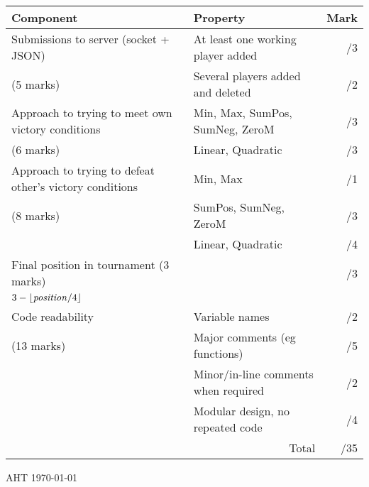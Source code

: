 \documentclass{article}
\begin{document}
\begin{tabular}{|l|l|r|}
\hline
Component & Property & Mark \\
\hline
Submissions to server (socket + JSON)
            & At least one working player added &  /3 \\
(5 marks)   & Several players added and deleted &  /2 \\
\hline
Approach to trying to meet own victory conditions
            & Min, Max, SumPos, SumNeg, ZeroM &  /3\\
(6 marks)   & Linear, Quadratic               & /3\\
\hline
Approach to trying to defeat other's victory conditions
            & Min, Max              &  /1\\
(8 marks)   & SumPos, SumNeg, ZeroM &  /3\\
            & Linear, Quadratic     &  /4\\
\hline
Final position in tournament (3 marks) &  & /3\\
    $3 - \lfloor \mbox{\emph{position}}/4\rfloor$ & & \\
\hline
Code readability 
            & Variable names                       & /2\\
 (13 marks) & Major comments (eg functions)        & /5\\
            & Minor/in-line comments when required & /2\\
            & Modular design, no repeated code     & /4\\
\hline
 \multicolumn{2}{r}{Total}  & \multicolumn{1}{p{2cm}}{\hfill /35} \\
\end{tabular}


\vfill
AHT \today
\end{document}
